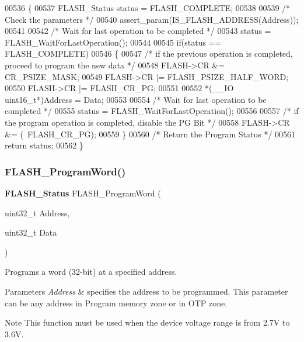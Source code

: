 \begin{DoxyCode}
00536 \{
00537   FLASH_Status status = FLASH_COMPLETE;
00538 
00539   \textcolor{comment}{/* Check the parameters */}
00540   assert_param(IS_FLASH_ADDRESS(Address));
00541 
00542   \textcolor{comment}{/* Wait for last operation to be completed */}
00543   status = FLASH_WaitForLastOperation();
00544   
00545   \textcolor{keywordflow}{if}(status == FLASH_COMPLETE)
00546   \{
00547     \textcolor{comment}{/* if the previous operation is completed, proceed to program the new data */}
00548     FLASH->CR &= CR_PSIZE_MASK;
00549     FLASH->CR |= FLASH_PSIZE_HALF_WORD;
00550     FLASH->CR |= FLASH_CR_PG;
00551   
00552     *(\_\_IO uint16\_t*)Address = Data;
00553         
00554     \textcolor{comment}{/* Wait for last operation to be completed */}
00555     status = FLASH_WaitForLastOperation();
00556 
00557     \textcolor{comment}{/* if the program operation is completed, disable the PG Bit */}
00558     FLASH->CR &= (~FLASH_CR_PG);
00559   \} 
00560   \textcolor{comment}{/* Return the Program Status */}
00561   \textcolor{keywordflow}{return} status;
00562 \}
\end{DoxyCode}
\mbox{\label{group__FLASH_gaac9a2f400b92537bd42a6bd7cc237b11}} 
\subsubsection{F\+L\+A\+S\+H\+\_\+\+Program\+Word()}
{\footnotesize\ttfamily \textbf{ F\+L\+A\+S\+H\+\_\+\+Status} F\+L\+A\+S\+H\+\_\+\+Program\+Word (\begin{DoxyParamCaption}\item[{uint32\+\_\+t}]{Address,  }\item[{uint32\+\_\+t}]{Data }\end{DoxyParamCaption})}



Programs a word (32-\/bit) at a specified address. 


\begin{DoxyParams}{Parameters}
{\em Address} & specifies the address to be programmed. This parameter can be any address in Program memory zone or in O\+TP zone. \\
\hline
\end{DoxyParams}
\begin{DoxyNote}{Note}
This function must be used when the device voltage range is from 2.\+7V to 3.\+6V. 
\end{DoxyNote}

